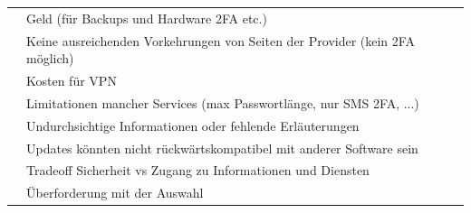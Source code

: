 \documentclass[german,report]{i1thesis}
\begin{document}
\begin{longtable}{|p{5cm}|p{9cm}|}
 & Geld (für Backups und Hardware 2FA etc.) \\ \cline{2-2}
 & Keine ausreichenden Vorkehrungen von Seiten der Provider (kein 2FA möglich) \\ \cline{2-2}
 & Kosten für VPN \\ \cline{2-2}
 & Limitationen mancher Services (max Passwortlänge, nur SMS 2FA, ...) \\ \cline{2-2}
 & Undurchsichtige Informationen oder fehlende Erläuterungen \\ \cline{2-2}
 & Updates könnten nicht rückwärtskompatibel mit anderer Software sein \\ \cline{2-2}
 & Tradeoff Sicherheit vs Zugang zu Informationen und Diensten \\ \cline{2-2}
 & Überforderung mit der Auswahl \\
\hline
\end{longtable}



\newpage
\makebib
\end{document}
